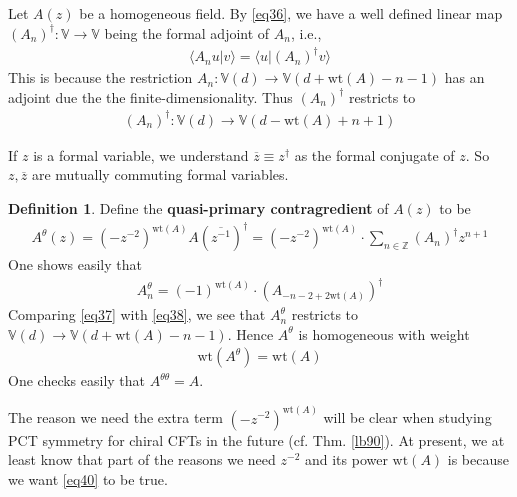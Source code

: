 \documentclass[12pt,b5paper,notitlepage]{article}
\theoremstyle{definition}
\newtheorem{df}{Definition}[section]
\theoremstyle{plain}
\newcommand{\ovl}{\overline}
\newcommand{\bk}[1]{\langle {#1}\rangle}
\newcommand{\Vbb}{\mathbb V}
\newcommand{\Zbb}{\mathbb Z}
\newcommand{\wt}{\mathrm{wt}}
\numberwithin{equation}{section}
\begin{document}
\subsection{}


Let $A(z)$ be a homogeneous field. By \eqref{eq36}, we have a well defined linear map $(A_n)^\dagger:\Vbb\rightarrow\Vbb$ being the formal adjoint of $A_n$, i.e.,
\begin{align*}
\bk{A_nu|v}=\bk{u|(A_n)^\dagger v}
\end{align*}
This is because the restriction $A_n:\Vbb(d)\rightarrow\Vbb(d+\wt(A)-n-1)$ has an adjoint due the the finite-dimensionality. Thus $(A_n)^\dagger$ restricts to
\begin{align}\label{eq38}
(A_n)^\dagger:\Vbb(d)\rightarrow\Vbb(d-\wt(A)+n+1)
\end{align}

If $z$ is a formal variable, we understand $\ovl z\equiv z^\dagger$ as the formal conjugate of $z$. So $z,\ovl z$ are mutually commuting formal variables.

\begin{df}\label{lb20}
Define the \textbf{quasi-primary contragredient}   of $A(z)$ to be
\begin{align}
A^\theta(z)=(-z^{-2})^{\wt(A)}A(\ovl{z^{-1}})^\dagger=(-z^{-2})^{\wt(A)}\cdot \sum_{n\in\Zbb} (A_n)^\dagger z^{n+1}
\end{align}
One shows easily that
\begin{align}\label{eq37}
A^\theta_n=(-1)^{\wt(A)}\cdot (A_{-n-2+2\wt(A)})^\dagger
\end{align}
Comparing \eqref{eq37} with \eqref{eq38}, we see that $A_n^\theta$ restricts to $\Vbb(d)\rightarrow\Vbb(d+\wt(A)-n-1)$. Hence $A^\theta$ is homogeneous with weight
\begin{align}\label{eq40}
\wt(A^\theta)=\wt(A)
\end{align}
One checks easily that $A^{\theta\theta}=A$.
\end{df}

The reason we need the extra term $(-z^{-2})^{\wt(A)}$ will be clear when studying PCT symmetry for chiral CFTs in the future (cf. Thm. \ref{lb90}). At present, we at least know that part of the reasons we need $z^{-2}$ and its power $\wt(A)$ is because we want \eqref{eq40} to be true.



\subsection{}
\end{document}
